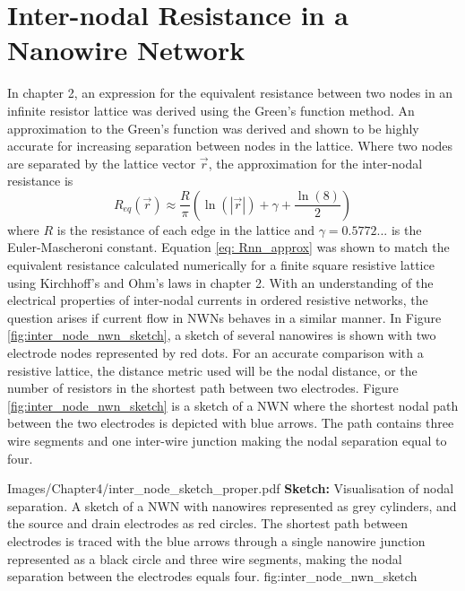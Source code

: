 \section{Inter-nodal Resistance in a Nanowire Network}
\label{Sec: Inter node}
In chapter 2, an expression for the equivalent resistance between two nodes in an infinite resistor lattice was derived using the Green's function method\cite{cserti2000}. An approximation to the Green's function was derived and shown to be highly accurate for increasing separation between nodes in the lattice. Where two nodes are separated by the lattice vector $\vec{r}$, the approximation for the inter-nodal resistance is\cite{cserti2000} 
\begin{equation}
R_{eq}(\vec{r}) \approx \frac{R}{\pi} \left( \ln(|\vec{r}|) + \gamma + \frac{\ln(8)}{2} \right) 
\label{eq: Rnn_approx}
\end{equation}
where $R$ is the resistance of each edge in the lattice and $\gamma = 0.5772...$ is the Euler-Mascheroni constant. Equation \ref{eq: Rnn_approx} was shown to match the equivalent resistance calculated numerically for a finite square resistive lattice using Kirchhoff's and Ohm's laws in chapter 2. With an understanding of the electrical properties of inter-nodal currents in ordered resistive networks, the question arises if current flow in NWNs behaves in a similar manner. In Figure \ref{fig:inter_node_nwn_sketch}, a sketch of several nanowires is shown with two electrode nodes represented by red dots. For an accurate comparison with a resistive lattice, the distance metric used will be the nodal distance, or the number of resistors in the shortest path between two electrodes. Figure \ref{fig:inter_node_nwn_sketch} is a sketch of a NWN where the shortest nodal path between the two electrodes is depicted with blue arrows. The path contains three wire segments and one inter-wire junction making the nodal separation equal to four.  

{Images/Chapter4/inter_node_sketch_proper.pdf}
{\textbf{Sketch:} Visualisation of nodal separation.}
{A sketch of a NWN with nanowires represented as grey cylinders, and the source and drain electrodes as red circles. The shortest path between electrodes is traced with the blue arrows through a single nanowire junction represented as a black circle and three wire segments, making the nodal separation between the electrodes equals four.}
{fig:inter_node_nwn_sketch}

